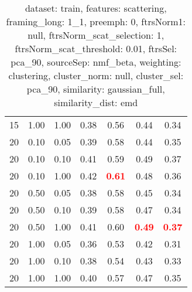 \begin{table}
\begin{center}
\begin{tabular}{lllcccc}
15 & 1.00 & 1.00 & 0.38 & 0.56 & 0.44 & 0.34 \\ 
20 & 0.10 & 0.05 & 0.39 & 0.58 & 0.44 & 0.35 \\ 
20 & 0.10 & 0.10 & 0.41 & 0.59 & 0.49 & 0.37 \\ 
20 & 0.10 & 1.00 & 0.42 & \textbf{\textcolor{red}{0.61}} & 0.48 & 0.36 \\ 
20 & 0.50 & 0.05 & 0.38 & 0.58 & 0.45 & 0.34 \\ 
20 & 0.50 & 0.10 & 0.39 & 0.58 & 0.47 & 0.34 \\ 
20 & 0.50 & 1.00 & 0.41 & 0.60 & \textbf{\textcolor{red}{0.49}} & \textbf{\textcolor{red}{0.37}} \\ 
20 & 1.00 & 0.05 & 0.36 & 0.53 & 0.42 & 0.31 \\ 
20 & 1.00 & 0.10 & 0.38 & 0.54 & 0.43 & 0.33 \\ 
20 & 1.00 & 1.00 & 0.40 & 0.57 & 0.47 & 0.35 \\ 
\end{tabular} 
\end{center} 
\caption{dataset: train, features: scattering, framing\_long: 1\_1, preemph: 0, ftrsNorm1: null, ftrsNorm\_scat\_selection: 1, ftrsNorm\_scat\_threshold: 0.01, ftrsSel: pca\_90, sourceSep: nmf\_beta, weighting: clustering, cluster\_norm: null, cluster\_sel: pca\_90, similarity: gaussian\_full, similarity\_dist: emd} 
\label{datasetrFeaturscFraminlong1_1Preemp0Ftrsnorm1nuFtrsnoscatselect1Ftrsnoscatthresh0.01Ftrsselpc90SourcesepnmbeWeightclClustenormnuClusteselpc90SimilagafuSimiladistem} 
\end{table} 
 
